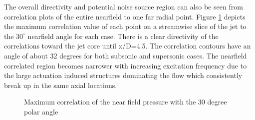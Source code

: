 \documentclass[english]{aiaa-tc}
\begin{document}
The overall directivity and potential noise source region can also be seen from correlation plots of the entire nearfield to one far radial point. Figure \ref{maxCorrel} depicts the maximum correlation value of each point on a streamwise slice of the jet to the $30^{\circ}$ nearfield angle for each case. There is a clear directivity of the correlations toward the jet core until x/D=4.5. The correlation contours have an angle of about 32 degrees for both subsonic and supersonic cases. The nearfield correlated region becomes narrower with increasing excitation frequency due to the large actuation induced structures dominating the flow which consistently break up in the same axial locations.
\begin{figure}
\begin{centering}

\end{centering}
\caption{Maximum correlation of the near field pressure with the 30 degree polar angle}\label{maxCorrel}
\end{figure}
\end{document}
